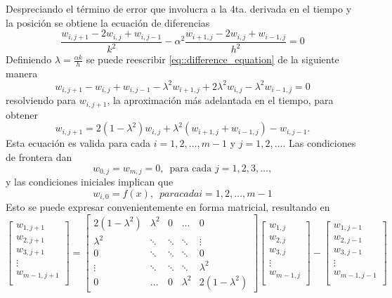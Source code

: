 \documentclass[a4paper]{article}
\begin{document}
Despreciando el término de error que involucra a la 4ta. derivada en el tiempo y la posición se obtiene la ecuación de diferencias
\begin{equation}\label{eq::difference_equation}
\frac{w_{i,j+1}-2w_{i,j}+w_{i,j-1}}{k^2}-\alpha^2\frac{w_{i+1,j}-2w_{i,j}+w_{i-1,j}}{h^2}=0
\end{equation}
Definiendo $\lambda=\frac{\alpha k}{h}$ se puede reescribir \ref{eq::difference_equation} de la siguiente manera
\begin{equation}\label{eq::difference_equation_2}
w_{i,j+1}-w_{i,j}+w_{i,j-1}-\lambda^2 w_{i+1,j}+2\lambda^2 w_{i,j}-\lambda^2 w_{i-1,j}=0
\end{equation}
resolviendo para $w_{i,j+1}$, la aproximación más adelantada en el tiempo, para obtener
\begin{equation}\label{eq::difference_equation_3}
w_{i,j+1}=2(1-\lambda^2)w_{i,j}+\lambda^2(w_{i+1,j}+w_{i-1,j})-w_{i,j-1}.
\end{equation}
Esta ecuación es valida para cada $i=1,2,\hdots,m-1$ y $j=1,2,\hdots$. Las condiciones de frontera dan
\begin{equation}\label{eq::condition_1}
w_{0,j}=w_{m,j}=0,\,\,\,\text{para cada }j=1,2,3,\hdots,
\end{equation}
y las condiciones iniciales implican que
\begin{equation}
w_{i,0}=f(x), \,\,\, para cada i=1,2,\hdots,m-1
\end{equation}
Esto se puede expresar convenientemente en forma matricial, resultando en 
\begin{equation}\label{eq::matrix_difference_equation}
\begin{bmatrix}
w_{1,j+1}\\
w_{2,j+1}\\
w_{3,j+1}\\
\vdots\\
w_{m-1,j+1}\\
\end{bmatrix}
=
\begin{bmatrix}
2(1-\lambda^2) & \lambda^2 & 0 &\dots&0 \\
\lambda^2     &\ddots    & \ddots& \ddots&\vdots\\
0&\ddots&\ddots&\ddots&0\\
\vdots&\ddots&\ddots&\ddots&\lambda^2 \\
0&\dots&0&\lambda^2 &2(1-\lambda^2)
\end{bmatrix}
\begin{bmatrix}
w_{1,j}\\
w_{2,j}\\
w_{3,j}\\
\vdots\\
w_{m-1,j}\\
\end{bmatrix}-
\begin{bmatrix}
w_{1,j-1}\\
w_{2,j-1}\\
w_{3,j-1}\\
\vdots\\
w_{m-1,j-1}\\
\end{bmatrix}
\end{equation}
\end{document}
